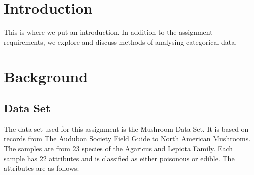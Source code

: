 \documentclass[12pt]{book}
\begin{document}

\tableofcontents
\pagebreak

\chapter{Introduction}
This is where we put an introduction.
In addition to the assignment requirements, we explore and discuss methods of analysing categorical data.
\chapter{Background}

\section{Data Set}
The data set used for this assignment is the Mushroom Data Set.\cite{dataset}
It is based on records from The Audubon Society Field Guide to North American Mushrooms.
The samples are from 23 species of the Agaricus and Lepiota Family.
Each sample has 22 attributes and is classified as either poisonous or edible.
The attributes are as follows:
\end{document}
